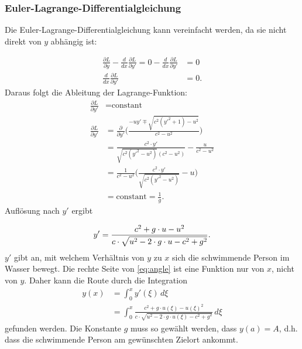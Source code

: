 \subsubsection{Euler-Lagrange-Differentialgleichung}
Die Euler-Lagrange-Differentialgleichung kann vereinfacht werden,
da sie nicht direkt von \(y\) abhängig ist:

\begin{align}
    \frac{\partial L}{\partial y} - \frac{d}{dx}\frac{\partial L}{\partial y'} = 0 - \frac{d}{dx}\frac{\partial L}{\partial y'} &= 0 \\
    \frac{d}{dx}\frac{\partial L}{\partial y'} &= 0.
\end{align}
Daraus folgt die Ableitung der Lagrange-Funktion:
\begin{align}
    \frac{\partial L}{\partial y'} &= \text{constant} \label{eq:Lagrange_derivites_1}\\
    \frac{\partial L}{\partial y'} &= \frac{\partial}{\partial y'} \biggl (\frac{-uy' \mp \sqrt{c^2(y'^2+1)-u^2}}{c^2-u^2}\biggr) \\
    &= \frac{c^2\cdot y'}{\sqrt{c^2(y'^2-u^2)}(c^2-u^2)} - \frac{u}{c^2-u^2} \\
    &=  \frac{1}{c^2-u^2} \biggl( \frac{c^2\cdot y'}{\sqrt{c^2(y'^2-u^2)}} - u \biggr ) \\
    &= \text{constant} = \frac{1}{g}.\label{eq:Lagrange_derivites_2}
\end{align}
Auflösung nach \(y'\) ergibt
   
\begin{equation}
    y' = \frac{c^2 + g\cdot u - u^2}{c \cdot \sqrt{u^2-2\cdot g\cdot u - c^2 + g^2}} .\label{eq:angle} \\
\end{equation}
\(y'\) gibt an, mit welchem Verhältnis von \(y\) zu \(x\) sich die
schwimmende Person im Wasser bewegt. Die rechte Seite von
\eqref{eq:angle} ist eine Funktion nur von \(x\), nicht von \(y\).
Daher kann die Route durch die Integration
\begin{align}
    y(x) &= \int_0^x y'(\xi) \,d\xi \\
    &= \int_0^x \frac{c^2+g\cdot u(\xi) - u(\xi)^2}{c\cdot \sqrt{u^2 - 2\cdot g \cdot u(\xi) - c^2 + g^2}} \,d\xi
\end{align}
gefunden werden. Die Konstante \(g\) muss so gewählt werden, dass
\(y(a) = A\), d.h. dass die schwimmende Person am gewünschten Zielort
ankommt.


